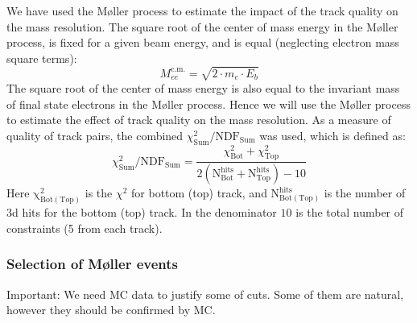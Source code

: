 \documentclass[letterpaper,12pt]{article}
\def \dstl {\displaystyle}
\def \Mlr {M\o ller }
\begin{document}
We have used the \Mlr process to estimate the impact of the track quality on the mass resolution. The square root of the center of mass energy in the \Mlr process, is fixed for a given beam energy, and is equal (neglecting electron mass square terms):
\begin{equation}
 \dstl M_{ee}^{\mathrm{c.m.}} = \sqrt{2\cdot m_{e}\cdot E_{b}}
\end{equation}
The square root of the center of mass energy is also equal to the invariant mass of final state electrons in the \Mlr process. Hence we will use the \Mlr process to estimate the effect of track quality on the mass resolution. As a measure of quality of track pairs, the  combined $\chi^{2}_{\mathrm{Sum}}/\mathrm{NDF_{Sum}}$ was used, which is defined as:
\begin{equation}
    \chi^{2}_{\mathrm{Sum}}/\mathrm{NDF_{Sum}} = \frac{\dstl \chi^{2}_{ \mathrm{Bot}} + \chi^{2}_{\mathrm{Top}} }{ \mathrm{\dstl 2\left(N_{Bot}^{hits} + N_{Top}^{hits}\right) - 10}}
\end{equation}
Here $\mathrm{\chi^{2}_{Bot(Top)}}$ is the $\chi^{2}$ for bottom (top) track, and 
$\mathrm{ N^{hits}_{Bot(Top) } }$ is the number of 3d hits for the bottom (top) track.
In the denominator $10$ is the total number of constraints (5 from each track).

\subsubsection{Selection of \Mlr events}
{\color{Red} Important: We need MC data to justify some of cuts. Some of them are natural, however they should be confirmed by MC.}
\end{document}
